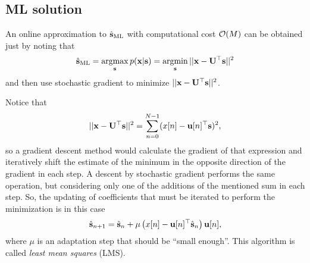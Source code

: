 \subsection{ML solution}

An online approximation to $\hat{{\mathbf s}}_\text{ML}$ with computational cost ${\mathcal O}(M)$ can be obtained just by noting that
\begin{equation}
\hat{{\mathbf s}}_\text{ML} = \operatorname*{argmax}_{{\mathbf s}} p({\mathbf x}|{\mathbf s}) =  \operatorname*{argmin}_{{\mathbf s}} ||{\mathbf x} - {\mathbf U}^\top{\mathbf s}||^2
\end{equation}
and then use stochastic gradient to minimize $||{\mathbf x} - {\mathbf U}^\top {\mathbf s} ||^2$.

Notice that
\begin{equation}
||{\mathbf x} - {\mathbf U}^\top{\mathbf s}||^2 = \sum_{n=0}^{N-1} (x[n] - {\mathbf u}[n]^\top{\mathbf s})^2,
\end{equation}
so a gradient descent method would calculate the gradient of that expression and iteratively shift the estimate of the minimum in the opposite direction of the gradient in each step. A descent by stochastic gradient performs the same operation, but considering only one of the additions of the mentioned sum in each step. So,
the updating of coefficients that must be iterated to perform the minimization is in this case
\begin{equation}
\hat{{\mathbf s}}_{n+1} = \hat{{\mathbf s}}_n + \mu \left(x[n] - {\mathbf u}[n]^\top \hat{{\mathbf s}}_n\right){\mathbf u}[n],
\end{equation}
where $\mu$ is an adaptation step that should be ``small enough''. This algorithm is called \emph{least mean squares} (LMS).

